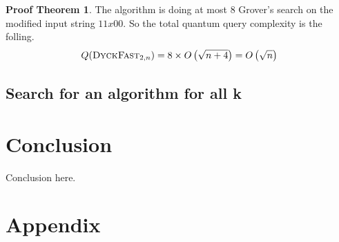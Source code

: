 \documentclass[11pt,a4paper]{article}
\theoremstyle{definition}
\theoremstyle{plain}
\theoremstyle{definition}
\newtheorem{tproof}{Proof Theorem}[section]
\begin{document}
\begin{tproof}
    The algorithm is doing at most 8 Grover's search on the modified input string $11x00$.
    So the total quantum query complexity is the folling.
    \[Q(\textsc{DyckFast}_{2, n}) = 8\times O\left(\sqrt{n+4}\right) = O\left(\sqrt{n}\right)\]
\end{tproof}

\subsection{Search for an algorithm for all k}

\section{Conclusion}

Conclusion here.





\newpage

\section{Appendix}
\end{document}
